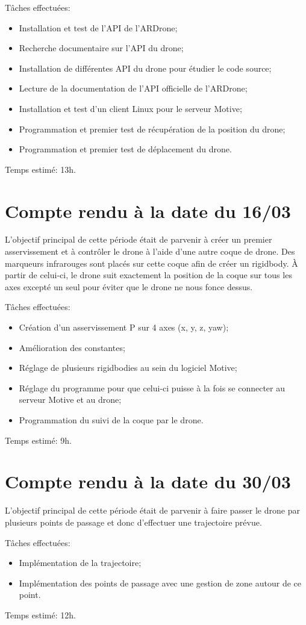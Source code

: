 Tâches effectuées:
\begin{itemize}
	\item Installation et test de l'API de l'ARDrone;
	\item Recherche documentaire sur l'API du drone;
	\item Installation de différentes API du drone pour étudier le code source;
	\item Lecture de la documentation de l'API officielle de l'ARDrone;
	\item Installation et test d'un client Linux pour le serveur Motive;
	\item Programmation et premier test de récupération de la position du drone;
	\item Programmation et premier test de déplacement du drone. \\
\end{itemize}

Temps estimé: 13h.


\section{Compte rendu à la date du 16/03}
L'objectif principal de cette période était de parvenir à créer un premier asservissement et à contrôler le drone à l'aide d'une autre coque de drone. Des marqueurs infrarouges sont placés sur cette coque afin de créer un rigidbody. À partir de celui-ci, le drone suit exactement la position de la coque sur tous les axes excepté un seul pour éviter que le drone ne nous fonce dessus.

Tâches effectuées:
\begin{itemize}
	\item Création d'un asservissement P sur 4 axes (x, y, z, yaw);
	\item Amélioration des constantes;
	\item Réglage de plusieurs rigidbodies au sein du logiciel Motive;
	\item Réglage du programme pour que celui-ci puisse à la fois se connecter au serveur Motive et au drone;
	\item Programmation du suivi de la coque par le drone. \\
\end{itemize}

Temps estimé: 9h.

\section{Compte rendu à la date du 30/03}
L'objectif principal de cette période était de parvenir à faire passer le drone par plusieurs points de passage et donc d'effectuer une trajectoire prévue.

Tâches effectuées:
\begin{itemize}
	\item Implémentation de la trajectoire;
	\item Implémentation des points de passage avec une gestion de zone autour de ce point. \\
\end{itemize}

Temps estimé: 12h.
